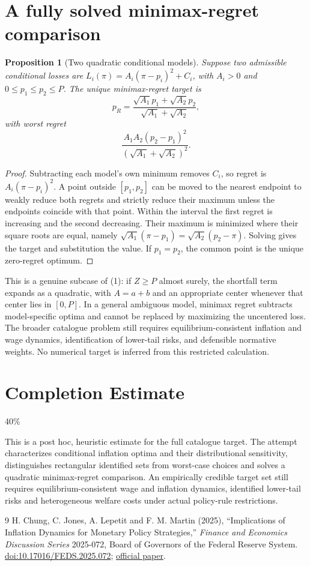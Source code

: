\documentclass[11pt,a4paper]{article}
\newtheorem{proposition}[theorem]{Proposition}
\theoremstyle{remark}
\begin{document}
\section{A fully solved minimax-regret comparison}
\begin{proposition}[Two quadratic conditional models]
Suppose two admissible conditional losses are
$L_i(\pi)=A_i(\pi-p_i)^2+C_i$, with $A_i>0$ and $0\le p_1\le p_2\le P$. The unique minimax-regret target is
\[
 p_R=\frac{\sqrt{A_1}p_1+\sqrt{A_2}p_2}{\sqrt{A_1}+\sqrt{A_2}},
\]
with worst regret
\[
 \frac{A_1A_2(p_2-p_1)^2}{(\sqrt{A_1}+\sqrt{A_2})^2}.
\]
\end{proposition}
\begin{proof}
Subtracting each model's own minimum removes $C_i$, so regret is $A_i(\pi-p_i)^2$. A point outside $[p_1,p_2]$ can be moved to the nearest endpoint to weakly reduce both regrets and strictly reduce their maximum unless the endpoints coincide with that point. Within the interval the first regret is increasing and the second decreasing. Their maximum is minimized where their square roots are equal, namely $\sqrt{A_1}(\pi-p_1)=\sqrt{A_2}(p_2-\pi)$. Solving gives the target and substitution the value. If $p_1=p_2$, the common point is the unique zero-regret optimum.
\end{proof}
This is a genuine subcase of (1): if $Z\ge P$ almost surely, the shortfall term expands as a quadratic, with $A=a+b$ and an appropriate center whenever that center lies in $[0,P]$. In a general ambiguous model, minimax regret subtracts model-specific optima and cannot be replaced by maximizing the uncentered loss. The broader catalogue problem still requires equilibrium-consistent inflation and wage dynamics, identification of lower-tail risks, and defensible normative weights. No numerical target is inferred from this restricted calculation.

\section{Completion Estimate}
40\%

This is a post hoc, heuristic estimate for the full catalogue target.
The attempt characterizes conditional inflation optima and their distributional sensitivity, distinguishes rectangular identified sets from worst-case choices and solves a quadratic minimax-regret comparison. An empirically credible target set still requires equilibrium-consistent wage and inflation dynamics, identified lower-tail risks and heterogeneous welfare costs under actual policy-rule restrictions.

\begin{thebibliography}{9}
 H. Chung, C. Jones, A. Lepetit and F. M. Martin (2025), ``Implications of Inflation Dynamics for Monetary Policy Strategies,'' \emph{Finance and Economics Discussion Series} 2025-072, Board of Governors of the Federal Reserve System. \href{https://doi.org/10.17016/FEDS.2025.072}{doi:10.17016/FEDS.2025.072}; \href{https://www.federalreserve.gov/econres/feds/files/2025072pap.pdf}{official paper}.
\end{thebibliography}
\end{document}
